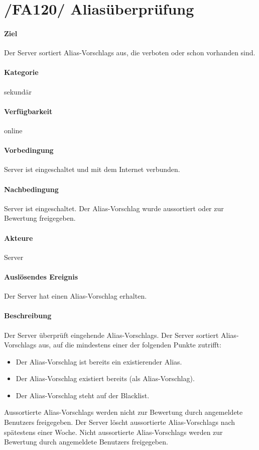 \section[Aliasüberprüfung]{/FA120/ Aliasüberprüfung}
\label{/FA120/}
\paragraph{Ziel}
Der \Gls{Server} sortiert \Glspl{Alias-Vorschlag} aus, die verboten oder schon vorhanden sind.
\paragraph{Kategorie}
sekundär
\paragraph{Verfügbarkeit}
online
\paragraph{Vorbedingung}
\Gls{Server} ist eingeschaltet und mit dem Internet verbunden.
\paragraph{Nachbedingung}
\Gls{Server} ist eingeschaltet. Der \Gls{Alias-Vorschlag} wurde aussortiert oder zur Bewertung freigegeben.
\paragraph{Akteure}
\Gls{Server}
\paragraph{Auslösendes Ereignis}
Der \Gls{Server} hat einen \Gls{Alias-Vorschlag} erhalten.
\paragraph{Beschreibung}
Der \Gls{Server} überprüft eingehende \Glspl{Alias-Vorschlag}. Der \Gls{Server} sortiert \Glspl{Alias-Vorschlag} aus, auf die mindestens einer der folgenden Punkte zutrifft:
\begin{itemize}
    \item Der \Gls{Alias-Vorschlag} ist bereits ein existierender \Gls{Alias}.
    \item Der \Gls{Alias-Vorschlag} existiert bereits (als \Gls{Alias-Vorschlag}).
    \item Der \Gls{Alias-Vorschlag} steht auf der \Gls{Blacklist}.
\end{itemize}
Aussortierte \Glspl{Alias-Vorschlag} werden nicht zur Bewertung durch angemeldete \Glspl{Benutzer} freigegeben. Der \Gls{Server} löscht aussortierte \Glspl{Alias-Vorschlag} nach spätestens einer Woche. Nicht aussortierte \Glspl{Alias-Vorschlag} werden zur Bewertung durch angemeldete \Glspl{Benutzer} freigegeben.

